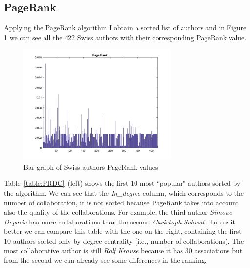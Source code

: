 \documentclass[]{usiinfbachelorproject}
\begin{document}
\subsection{PageRank}
Applying the PageRank algorithm I obtain a sorted list of authors and in Figure \ref{fig:pagerank_bars} we can see all the 422 Swiss authors with their corresponding PageRank value. 

\begin{figure}[tb]
	\centering
	\includegraphics[height=6cm]{img/Analysis/page_rank_bars.jpg}
	\caption{ Bar graph of Swiss authors PageRank values}
	\label{fig:pagerank_bars}
\end{figure}

Table~\ref{table:PRDC}~(left) shows the first 10 most ``popular" authors sorted by the algorithm.
We can see that the \textit{In\_degree} column, which corresponds to the number of collaboration, it is not sorted because PageRank takes into account also the quality of the collaborations.
For example, the third author \textit{Simone Deparis} has more collaborations than the second \textit{Christoph Schwab}.
To see it better we can compare this table with the one on the right, containing the first 10 authors sorted only by degree-centrality (i.e., number of collaborations). The most collaborative author is still \textit{Rolf Krause} because it has 30 associations but from the second we can already see some differences in the ranking.
\end{document}
